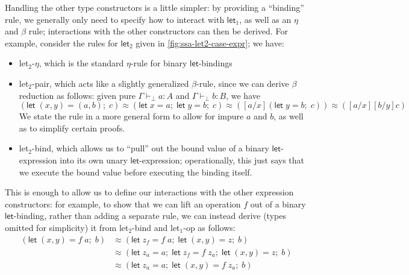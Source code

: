 \documentclass[acmsmall,screen,review]{acmart}
\newcommand{\ms}[1]{\ensuremath{\mathsf{#1}}}
\newcommand{\letexpr}[3]{\ensuremath{\ms{let}\;#1 = #2;\;#3}}
\newcommand{\hasty}[4]{#1 \vdash_{#2} #3: {#4}}
\newcommand{\teqv}{\approx}
\newcommand{\brle}[1]{{\textsf{#1}}}
\begin{document}
Handling the other type constructors is a little simpler: by providing a ``binding'' rule, we
generally only need to specify how to interact with $\ms{let}_1$, as well as an $\eta$ and $\beta$
rule; interactions with the other constructors can then be derived. For example, consider the rules
for $\ms{let}_2$ given in \ref{fig:ssa-let2-case-expr}; we have:
\begin{itemize}
  \item \brle{let$_2$-$\eta$}, which is the standard $\eta$-rule for binary \ms{let}-bindings
  \item \brle{let$_2$-pair}, which acts like a slightly generalized $\beta$-rule, since we can
  derive $\beta$ reduction as follows: given pure $\hasty{\Gamma}{\bot}{a}{A}$ and
  $\hasty{\Gamma}{\bot}{b}{B}$, we have
  $$
  (\letexpr{(x, y)}{(a, b)}{c}) 
  \teqv (\letexpr{x}{a}{\letexpr{y}{b}{c}})
  \teqv ([a/x](\letexpr{y}{b}{c}))
  \teqv ([a/x][b/y]c)
  $$
  We state the rule in a more general form to allow for impure $a$ and $b$, as well as to simplify
  certain proofs.
  \item \brle{let$_2$-bind}, which allows us to ``pull'' out the bound value of a binary
  \ms{let}-expression into its own unary \ms{let}-expression; operationally, this just says that
  we execute the bound value before executing the binding itself.
\end{itemize}
This is enough to allow us to define our interactions with the other expression constructors: for
example, to show that we can lift an operation $f$ out of a binary $\ms{let}$-binding, rather than
adding a separate rule, we can instead derive (types omitted for simplicity) it from
\brle{let$_2$-bind} and \brle{let$_1$-op} as follows:
\begin{align*}
  (\letexpr{(x, y)}{f\;a}{b})
  &\teqv (\letexpr{z_f}{f\;a}{\letexpr{(x, y)}{z}{b}}) \\
  &\teqv (\letexpr{z_a}{a}{\letexpr{z_f}{f\;z_a}{\letexpr{(x, y)}{z}{b}}}) \\
  &\teqv (\letexpr{z_a}{a}{\letexpr{(x, y)}{f\;z_a}{b}})
\end{align*}
\end{document}
